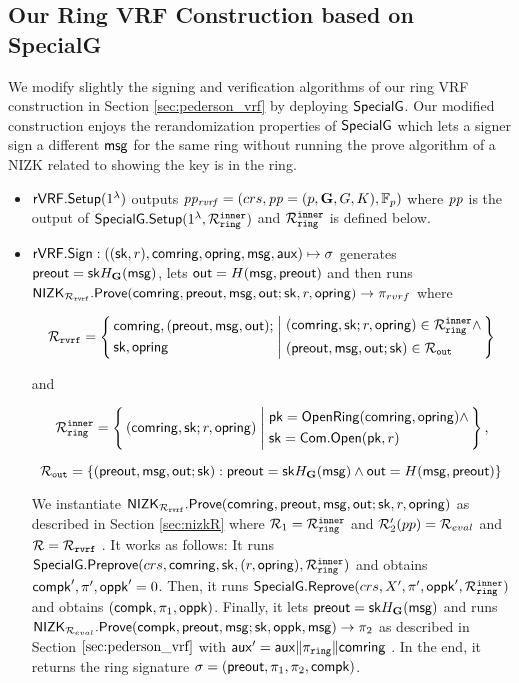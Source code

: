 \subsection{Our Ring VRF Construction based on SpecialG}

\label{subsec:rvrf_faster}
We modify slightly the signing and verification algorithms of our ring VRF construction in Section \ref{sec:pederson_vrf} by deploying $ {\mathsf{SpecialG}} $. 
Our modified construction enjoys the rerandomization properties of $ {\mathsf{SpecialG}} $ which lets a signer sign a 
different $ \mathsf{msg} $ for the same ring without running the prove algorithm of a NIZK related to showing the key is in the ring.  
\begin{itemize}
	\item $ {\mathsf{rVRF}}.{\mathsf{Setup}}(1^\lambda)   $ outputs $ \mathit{pp_{\mathit{rvrf}}} = (crs, \mathit{pp} = (p, {\mathbf{G}},G, K), \mathbb{F}_p) $ where $ \mathit{pp} $ is the output of $ {\mathsf{SpecialG}}.{\mathsf{Setup}}(1^\lambda, \mathcal{R}_{\mathtt{ring}}^{\mathtt{inner}}) $ and $\mathcal{R}_{\mathtt{ring}}^{\mathtt{inner}}$ is defined below.
	\item ${\mathsf{rVRF}}.{\mathsf{Sign}} : ((\mathsf{sk},r),\mathsf{comring}, \mathsf{opring},\mathsf{msg},\mathsf{aux}) \mapsto \sigma$ generates $ {\mathsf{preout}} = \mathsf{sk} H_{\mathbf{G}}(\mathsf{msg}) $, lets $ {\mathsf{out}} = H(\mathsf{msg}, {\mathsf{preout}}) $ and then runs $ {\mathsf{NIZK}}_{\mathcal{R}_{\mathtt{rvrf}}}.{\mathsf{Prove}}(\mathsf{comring},{\mathsf{preout}}, \mathsf{msg}, {\mathsf{out}}; \mathsf{sk},r,\mathsf{opring})\rightarrow \pi_{rvrf}$ where
	
	$$ \relrvrf = \Setst{
		\begin{aligned}
			&\comring, (\PreOut,\msg, \Out); \\
			&\sk, \openring
		\end{aligned}
	}{
		\begin{aligned}
			& (\comring,\sk;r,\openring) \in \relinner \wedge \\
			& (\PreOut, \msg, \Out; \sk) \in \relout
	\end{aligned}	}$$   
	
	and 
	
	$$ \relinner = \Setst{ (\comring, \sk ; r,\openring) }{
		\begin{aligned}
			&	\pk = \OpenRing(\comring,\openring) \wedge \\
			& 	\sk = \mathsf{Com}.\mathsf{Open}(\pk,r) 
		\end{aligned}	
	},$$
	
	$$\mathcal{R}_{\mathtt{out}} = \{({\mathsf{preout}}, \mathsf{msg},{\mathsf{out}}; \mathsf{sk}): {\mathsf{preout}} = \mathsf{sk} H_{\mathbf{G}}(\mathsf{msg}) \wedge {\ensuremath{\mathsf{out}}} = H(\mathsf{msg},{\mathsf{preout}})\}$$
	
	
	We instantiate $ {\mathsf{NIZK}}_{\mathcal{R}_{\mathtt{rvrf}}}.{\mathsf{Prove}}(\mathsf{comring},{\mathsf{preout}}, \mathsf{msg}, {\mathsf{out}}; \mathsf{sk},r,\mathsf{opring}) $ as described in Section \ref{sec:nizkR} where $ \mathcal{R}_1 = \mathcal{R}_{\mathtt{ring}}^{\mathtt{inner}} $ and $ \mathcal{R}_2'(pp) = \mathcal{R}_{eval} $ and $\mathcal{R} = \mathcal{R}_{\mathtt{rvrf}}$ . It works as follows: It runs $ {\mathsf{SpecialG}}.{\mathsf{Preprove}}(crs, \mathsf{comring},\mathsf{sk},(r,\mathsf{opring}),\mathcal{R}_{\mathtt{ring}}^{\mathtt{inner}}) $ and obtains $ \mathsf{compk}', \pi' , \mathsf{oppk}' = 0$. Then, it runs $ {\mathsf{SpecialG}}.{\mathsf{Reprove}}(crs, X',\pi',\mathsf{oppk}',\mathcal{R}_{\mathtt{ring}}^{\mathtt{inner}}) $ and obtains $ (\mathsf{compk}, \pi_1, \mathsf{oppk}) $. Finally, it lets $ {\mathsf{preout}} = \mathsf{sk} H_{\mathbf{G}}(\mathsf{msg}) $ and runs $ {\mathsf{NIZK}}_{\mathcal{R}_{eval}}.{\mathsf{Prove}}(\mathsf{compk}, {\mathsf{preout}}, \mathsf{msg};\mathsf{sk},\mathsf{oppk},\mathsf{msg}) \rightarrow \pi_2 $ as described in Section $ \ref{sec:pederson_vrf} $ with $\mathsf{aux}' = \mathsf{aux} \| \pi_{\mathtt{ring}} \| \mathsf{comring}$ .	
	In the end, it returns the ring signature $ \sigma = ({\mathsf{preout}},  \pi_1,\pi_2, \mathsf{compk}) $.
	

\end{itemize}
